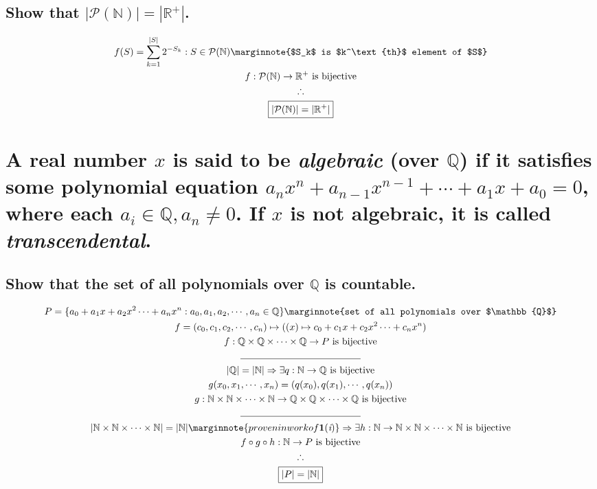 \documentclass[letterpaper]{article}
\begin{document}
\subsection{Show that $|\mathcal{P}(\mathbb{N})|=|\mathbb{R}^+|$.}
\begin{gather*}
f(S)=\sum_{k=1}^{|S|}2^{-S_k}: S\in\mathcal{P}(\mathbb{N}) \marginnote{$S_k$ is $k^\text{th}$ element of $S$} \\
f:\mathcal{P}(\mathbb{N})\rightarrow \mathbb{R}^+ \text{ is bijective} \\
\therefore \\
\boxed{|\mathcal{P}(\mathbb{N})|=|\mathbb{R}^+|}
\end{gather*}

\section{A real number $x$ is said to be \textit{algebraic} (over $\mathbb{Q}$) if it satisfies some polynomial equation $a_nx^n+a_{n-1}x^{n-1}+\dotsb+a_1x+a_0=0$, where each $a_i\in\mathbb{Q},a_n\neq0$. If $x$ is not algebraic, it is called \textit{transcendental}.}
\subsection{Show that the set of all polynomials over $\mathbb{Q}$ is countable.}
\begin{gather*}
P=\{a_0+a_1x+a_2x^2\dotsb+a_nx^n:a_0,a_1,a_2,\dotsb,a_n\in\mathbb{Q}\} \marginnote{set of all polynomials over $\mathbb{Q}$} \\
f=(c_0,c_1,c_2,\dotsb,c_n)\mapsto((x)\mapsto c_0+c_1x+c_2x^2\dotsb+c_nx^n) \\
f: \mathbb{Q}\times\mathbb{Q}\times\dotsb\times\mathbb{Q}\rightarrow P \text{ is bijective} \\
\line(1, 0){125} \\
|\mathbb{Q}|=|\mathbb{N}|\Rightarrow\exists q:\mathbb{N}\rightarrow\mathbb{Q}\text{ is bijective} \\
g(x_0,x_1,\dotsb,x_n)=(q(x_0),q(x_1),\dotsb,q(x_n)) \\
g:\mathbb{N}\times\mathbb{N}\times\dotsb\times\mathbb{N}\rightarrow\mathbb{Q}\times\mathbb{Q}\times\dotsb\times\mathbb{Q}\text{ is bijective} \\
\line(1, 0){125} \\
|\mathbb{N}\times\mathbb{N}\times\dotsb\times\mathbb{N}|=|\mathbb{N}| \marginnote{proven in work of \textbf{1}(\textit{i})} \Rightarrow \exists h:\mathbb{N}\rightarrow\mathbb{N}\times\mathbb{N}\times\dotsb\times\mathbb{N}\text{ is bijective} \\
f\circ g\circ h:\mathbb{N}\rightarrow P\text{ is bijective} \\
\therefore \\
\boxed{|P|=|\mathbb{N}|}
\end{gather*}
\end{document}
